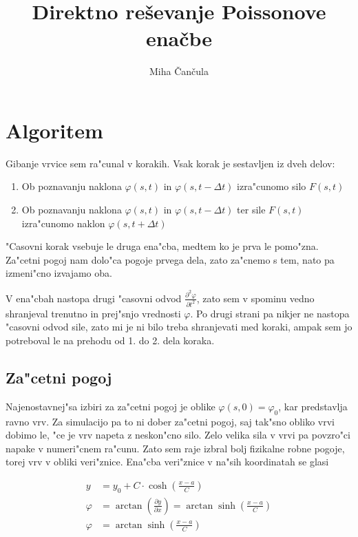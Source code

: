\documentclass[a4paper,10pt]{article}
\title{Direktno re\v sevanje Poissonove ena\v cbe}
\author{Miha \v Can\v cula}
\renewcommand{\phi}{\varphi}
\newcommand{\parcialno}[2]{
  \frac{\partial #1}{\partial #2}
}
\newcommand{\parcdva}[2]{
  \frac{\partial^2 #1}{\partial #2 ^2}
}
\begin{document}
\maketitle

\section{Algoritem}

Gibanje vrvice sem ra"cunal v korakih. Vsak korak je sestavljen iz dveh delov:
\begin{enumerate}
 \item Ob poznavanju naklona $\phi(s,t)$ in $\phi(s,t-\Delta t)$ izra"cunomo silo $F(s,t)$
 \item Ob poznavanju naklona $\phi(s,t)$ in $\phi(s,t-\Delta t)$ ter sile $F(s,t)$ izra"cunomo naklon $\phi(s,t+\Delta t)$
\end{enumerate}

"Casovni korak vsebuje le druga ena"cba, medtem ko je prva le pomo"zna. Za"cetni pogoj nam dolo"ca pogoje prvega dela, zato za"cnemo s tem, nato pa izmeni"cno izvajamo oba. 

V ena"cbah nastopa drugi "casovni odvod $\parcdva{\phi}{t}$, zato sem v spominu vedno shranjeval trenutno in prej"snjo vrednosti $\phi$. Po drugi strani pa nikjer ne nastopa "casovni odvod sile, zato mi je ni bilo treba shranjevati med koraki, ampak sem jo potreboval le na prehodu od 1. do 2. dela koraka. 

\subsection{Za"cetni pogoj}

Najenostavnej"sa izbiri za za"cetni pogoj je oblike $\phi(s,0) = \phi_0$, kar predstavlja ravno vrv. Za simulacijo pa to ni dober za"cetni pogoj, saj tak"sno obliko vrvi dobimo le, "ce je vrv napeta z neskon"cno silo. Zelo velika sila v vrvi pa povzro"ci napake v numeri"cnem ra"cunu. Zato sem raje izbral bolj fizikalne robne pogoje, torej vrv v obliki veri"znice. Ena"cba veri"znice v na"sih koordinatah se glasi

\begin{align}
  y &= y_0 + C \cdot \cosh \left(\frac{x-a}{C}\right) \\
  \phi &= \arctan \left(\parcialno{y}{x}\right) = \arctan \sinh\left(\frac{x-a}{C}\right) \\
  \phi &= \arctan \sinh\left(\frac{x-a}{C}\right)
\end{align}
\end{document}
